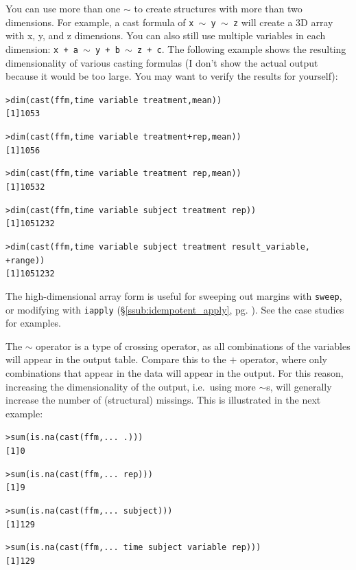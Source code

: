 \documentclass[oneside,letterpaper]{scrartcl}
\newcommand{\secref}[1]{\S \ref{#1}, pg. \pageref{#1}}
\begin{document}
You can use more than one $\sim$ to create structures with more than two dimensions.  For example, a cast formula of {\tt x $\sim$ y $\sim$ z} will create a 3D array with x, y, and z dimensions. You can also still use multiple variables in each dimension: {\tt x + a $\sim$ y + b $\sim$ z + c}.  The following example shows the resulting dimensionality of various casting formulas (I don't show the actual output because it would be too large.  You may want to verify the results for yourself):

\begin{alltt}
> dim(cast(ffm, time ~ variable ~ treatment, mean))
[1] 10  5  3

> dim(cast(ffm, time ~ variable ~ treatment + rep, mean))
[1] 10  5  6

> dim(cast(ffm, time ~ variable ~ treatment ~ rep, mean))
[1] 10  5  3  2

> dim(cast(ffm, time ~ variable ~ subject ~ treatment ~ rep))
[1] 10  5 12  3  2

> dim(cast(ffm, time ~ variable ~ subject ~ treatment ~ result_variable, 
+     range))
[1] 10  5 12  3  2

\end{alltt}

The high-dimensional array form is useful for sweeping out margins with {\tt sweep}, or modifying with {\tt iapply} (\secref{ssub:idempotent_apply}).  See the case studies for examples.  

The $\sim$ operator is a type of crossing operator, as all combinations of the variables will appear in the output table.   Compare this to the $+$ operator, where only combinations that appear in the data will appear in the output.  For this reason, increasing the dimensionality of the output, i.e.\ using more $\sim$s, will generally increase the number of (structural) missings.  This is illustrated in the next example:

\begin{alltt}
> sum(is.na(cast(ffm, ... ~ .)))
[1] 0

> sum(is.na(cast(ffm, ... ~ rep)))
[1] 9

> sum(is.na(cast(ffm, ... ~ subject)))
[1] 129

> sum(is.na(cast(ffm, ... ~ time ~ subject ~ variable ~ rep)))
[1] 129

\end{alltt}
\end{document}
